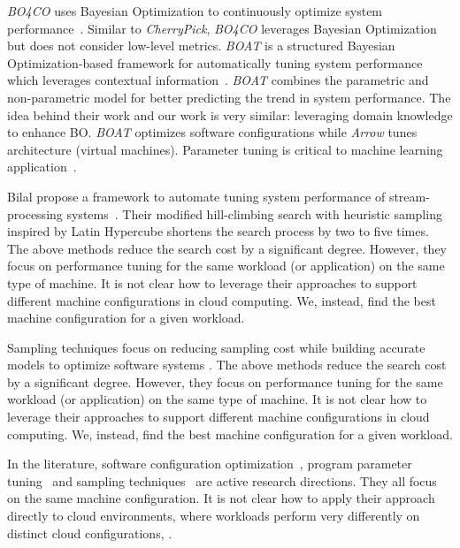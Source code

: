 \emph{BO4CO} uses Bayesian Optimization to continuously optimize system performance~\cite{jamshidi2016uncertainty}.
Similar to \emph{CherryPick}, \emph{BO4CO} leverages Bayesian Optimization but does not consider low-level metrics.
\emph{BOAT} is a structured Bayesian Optimization-based framework for automatically tuning system performance which leverages contextual information~\cite{Dalibard2017}.
\emph{BOAT} combines the parametric and non-parametric model
for better predicting the trend in system performance.
The idea behind their work and our work is very similar:
leveraging domain knowledge to enhance BO.
\emph{BOAT} optimizes software configurations while
\emph{Arrow} tunes architecture (virtual machines).
Parameter tuning is critical to machine learning application~\cite{Dewancker2015,shahriari2016taking,Klein2017,golovin2017google}.


Bilal \etal propose a framework to automate tuning system performance
of stream-processing systems~\cite{bilal2017towards}.
Their modified hill-climbing search with heuristic sampling
inspired by Latin Hypercube shortens the search process by two to five times.
The above methods reduce the search cost by a significant degree.
However, they focus on performance tuning for the same workload (or application)
on the same type of machine. It is not clear how to leverage their approaches to support different
machine configurations in cloud computing.
We, instead, find the best machine configuration for a given workload.

Sampling techniques focus on reducing sampling cost while building accurate models to optimize software systems \cite{oh2017finding, nair2017}.
The above methods reduce the search cost by a significant degree.
However, they focus on performance tuning for the same workload (or application) on the same type of machine. It is not clear how to leverage their approaches to support different
machine configurations in cloud computing. We, instead, find the best machine configuration for a given workload.


In the literature,
software configuration optimization~\cite{herodotou2011starfish,zhu2017bestconfig,bilal2017towards,Dalibard2017},
program parameter tuning~\cite{Klein2017,golovin2017google} and
sampling techniques~\cite{oh2017finding, nair2017} are active research directions.
They all focus on the same machine configuration.
It is not clear how to apply their approach directly to cloud environments, where
workloads perform very differently on distinct cloud configurations, .
